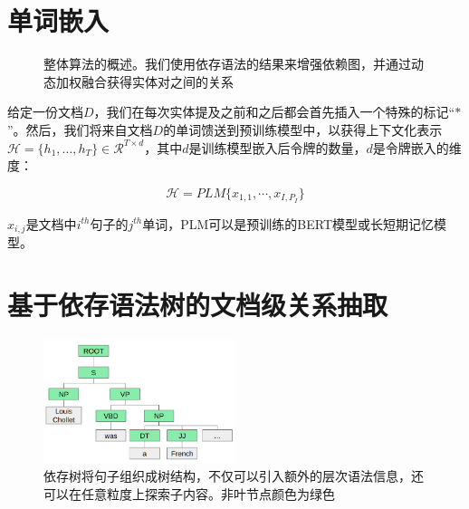 \documentclass[bachelor]{thesis-uestc}
\begin{document}
\section{单词嵌入}
\begin{figure}[t]
    \caption{整体算法的概述。我们使用依存语法的结果来增强依赖图，并通过动态加权融合获得实体对之间的关系}
    \label{fig:overview}
\end{figure}

给定一份文档$D$，我们在每次实体提及之前和之后都会首先插入一个特殊的标记“$*$”\cite{zhang-etal-2017-position}。然后，我们将来自文档$D$的单词馈送到预训练模型中，以获得上下文化表示 $\mathcal{H}=\{h_1, \dots, h_T\} \in \mathcal{R}^{T \times d}$，其中$d$是训练模型嵌入后令牌的数量，$d$是令牌嵌入的维度：

\begin{equation}
    \mathcal{H} = PLM \{x_{1,1},\cdots, x_{I,P_I}\}
    \label{PLM}
\end{equation}

$x_{i, j}$是文档中$i^{th}$句子的$j^{th}$单词，PLM可以是预训练的BERT模型\cite{BERT}或长短期记忆模型。

\section{基于依存语法树的文档级关系抽取}

\begin{figure}[t]
    \includegraphics[width=0.5\textwidth]{misc/constituency.png}
    \caption{依存树将句子组织成树结构，不仅可以引入额外的层次语法信息，还可以在任意粒度上探索子内容。非叶节点颜色为绿色} 
    \label{fig_syn_b}
\end{figure}
\end{document}
